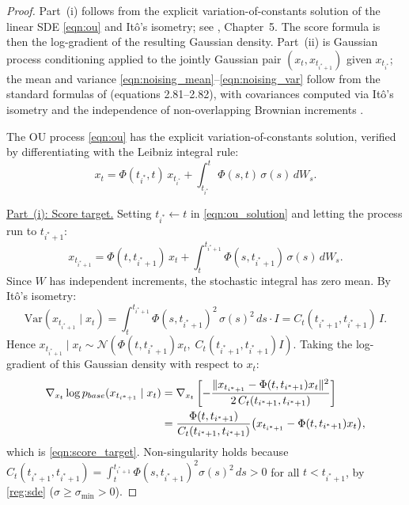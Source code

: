 \documentclass{article}
\newcommand{\pbase}{p_{\normalfont{base}}}
\begin{document}
\begin{proof}
Part~(i) follows from the explicit variation-of-constants solution of the linear SDE
\eqref{eqn:ou} and Itô's isometry; see \cite{oksendal2003stochastic}, Chapter~5.
The score formula is then the log-gradient of the resulting Gaussian density.
Part~(ii) is Gaussian process conditioning applied to the jointly Gaussian pair
$(x_t, x_{t_{i^*+1}})$ given $x_{t_{i^*}}$; the mean and variance
\eqref{eqn:noising_mean}--\eqref{eqn:noising_var} follow from the standard
formulas of \cite{bishop2006pattern} (equations 2.81--2.82), with covariances
computed via Itô's isometry and the independence of non-overlapping Brownian
increments \cite{oksendal2003stochastic}.

The OU process \eqref{eqn:ou} has the explicit variation-of-constants solution,
verified by differentiating with the Leibniz integral rule:
\begin{equation}\label{eqn:ou_solution}
  x_t = \Phi(t_{i^*},t)\,x_{t_{i^*}}
        + \int_{t_{i^*}}^{t}\Phi(s,t)\,\sigma(s)\,dW_s.
\end{equation}

\medskip\noindent\underline{Part~(i): Score target.}
Setting $t_{i^*}\leftarrow t$ in \eqref{eqn:ou_solution} and letting the process
run to $t_{i^*+1}$:
\begin{equation}\label{eqn:x_next}
  x_{t_{i^*+1}} = \Phi(t,t_{i^*+1})\,x_t
                  + \int_t^{t_{i^*+1}}\Phi(s,t_{i^*+1})\,\sigma(s)\,dW_s.
\end{equation}
Since $W$ has independent increments, the stochastic integral has zero mean.
By Itô's isometry:
\[
  \mathrm{Var}(x_{t_{i^*+1}}\mid x_t)
  = \int_t^{t_{i^*+1}}\Phi(s,t_{i^*+1})^2\,\sigma(s)^2\,ds\cdot I
  = C_t(t_{i^*+1},t_{i^*+1})\,I.
\]
Hence $x_{t_{i^*+1}}\mid x_t\sim\mathcal{N}\left(\Phi(t,t_{i^*+1})x_t,\;
C_t(t_{i^*+1},t_{i^*+1})I\right)$.
Taking the log-gradient of this Gaussian density with respect to $x_t$:
\begin{align*}
  \nabla_{x_t}\log\pbase(x_{t_{i^*+1}}\mid x_t)
  &= \nabla_{x_t}\left[
       -\frac{\|x_{t_{i^*+1}}-\Phi(t,t_{i^*+1})x_t\|^2}
             {2\,C_t(t_{i^*+1},t_{i^*+1})}
     \right] \\
  &= \frac{\Phi(t,t_{i^*+1})}{C_t(t_{i^*+1},t_{i^*+1})}
     \bigl(x_{t_{i^*+1}}-\Phi(t,t_{i^*+1})x_t\bigr),
\end{align*}
which is \eqref{eqn:score_target}.  Non-singularity holds because
$C_t(t_{i^*+1},t_{i^*+1})=\int_t^{t_{i^*+1}}\Phi(s,t_{i^*+1})^2\sigma(s)^2\,ds>0$
for all $t<t_{i^*+1}$, by \ref{reg:sde} ($\sigma\geq\sigma_{\min}>0$).


\end{proof}
\end{document}

